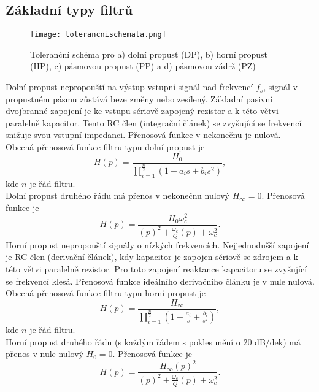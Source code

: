 \subsection{Základní typy filtrů}
\begin{figure}[h]
\centering
\texttt{[image: tolerancnischemata.png]}
\caption[Toleranční schéma dolní propusti (DP), horní propusti (HP), pásmové propusti (PP) a pásmové zádrže]{Toleranční schéma pro a) dolní propust (DP), b) horní propust (HP), c) pásmovou propust (PP) a d) pásmovou zádrž (PZ)\cite{7}}
\end{figure}
\noindent Dolní propust nepropouští na výstup vstupní signál nad frekvencí $f_s$, signál v propustném pásmu zůstává beze změny nebo zesílený. Základní pasivní dvojbranné zapojení je ke vstupu sériově zapojený rezistor a k této větvi paralelně kapacitor. Tento RC člen (integrační článek) se zvyšující se frekvencí snižuje svou vstupní impedanci. Přenosová funkce v nekonečnu je nulová. \\
Obecná přenosová funkce filtru typu dolní propust je
\begin{equation}
H(p) = \frac{H_0}{\prod_{i=1}^{\frac{n}{2}} (1 + a_i s + b_i s^2)} \label{r:FTR},
\end{equation}
kde $n$ je řád filtru.\\
Dolní propust druhého řádu má přenos v nekonečnu nulový $H_{\infty} = 0$. Přenosová funkce je
\begin{equation}
H(p) = \frac{H_0 \omega_c ^2}{(p)^2 + \frac{\omega _c}{Q}(p) + \omega _c ^2}.
\end{equation}
Horní propust nepropouští signály o nízkých frekvencích. Nejjednodušší zapojení je RC člen (derivační článek), kdy kapacitor je zapojen sériově se zdrojem a k této větvi paralelně rezistor. Pro toto zapojení reaktance kapacitoru se zvyšující se frekvencí klesá. Přenosová funkce ideálního derivačního článku je v nule nulová. \\
Obecná přenosová funkce filtru typu horní propust je
\begin{equation}
H(p) = \frac{H_{\infty}}{\prod_{i=1}^{\frac{n}{2}} (1 + \frac{a_i}{s} + \frac{b_i}{s^2})} \label{r:FTR2},
\end{equation}
kde $n$ je řád filtru.\\
Horní propust druhého řádu (s každým řádem s pokles mění o 20 dB/dek) má přenos v nule nulový $H_{0} = 0$. Přenosová funkce je
\begin{equation}
H(p) = \frac{H_{\infty} (p) ^2}{(p)^2 + \frac{\omega _c}{Q}(p) + \omega _c ^2}.
\end{equation}
